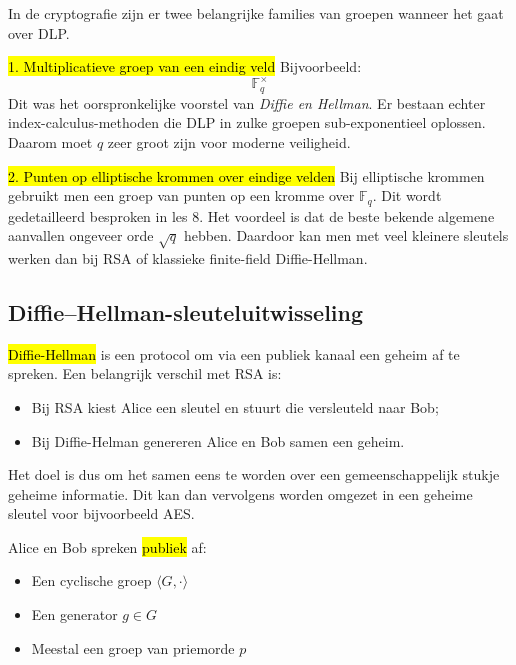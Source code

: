 
In de cryptografie zijn er twee belangrijke families van groepen wanneer het gaat over DLP.

\hl{1. Multiplicatieve groep van een eindig veld}\newline
Bijvoorbeeld:
\begin{equation*}
    \mathbb{F}_q^\times
\end{equation*}
Dit was het oorspronkelijke voorstel van \emph{Diffie en Hellman}. Er bestaan echter index-calculus-methoden die DLP in zulke groepen sub-exponentieel oplossen. Daarom moet $q$ zeer groot zijn voor moderne veiligheid. 

\hl{2. Punten op elliptische krommen over eindige velden}\newline
Bij elliptische krommen gebruikt men een groep van punten op een kromme over $\mathbb{F}_q$. Dit wordt gedetailleerd besproken in les 8.
Het voordeel is dat de beste bekende algemene aanvallen ongeveer orde $\sqrt{q}$ hebben. Daardoor kan men met veel kleinere sleutels werken dan bij RSA of klassieke finite-field Diffie-Hellman. 

\subsection{Diffie--Hellman-sleuteluitwisseling}\label{sec:l7_diffie-hellman}

\hl{Diffie-Hellman} is een protocol om via een publiek kanaal een geheim af te spreken. Een belangrijk verschil met RSA is:
\begin{itemize}
    \item Bij RSA kiest Alice een sleutel en stuurt die versleuteld naar Bob;
    \item Bij Diffie-Helman genereren Alice en Bob samen een geheim.
\end{itemize}
Het doel is dus om het samen eens te worden over een gemeenschappelijk stukje geheime informatie. Dit kan dan vervolgens worden omgezet in een geheime sleutel voor bijvoorbeeld AES.


Alice en Bob spreken \hl{publiek} af:
\begin{itemize}
    \item Een cyclische groep $\langle G,\cdot \rangle$
    \item Een generator $g \in G$
    \item Meestal een groep van priemorde $p$
\end{itemize}


